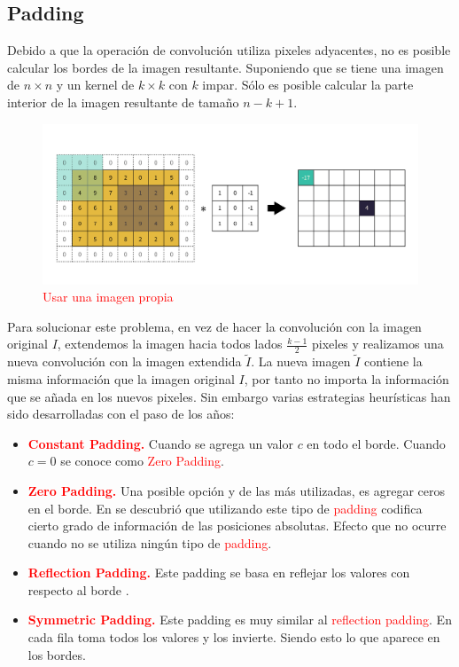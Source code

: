 \subsection{Padding}
 Debido a que la operación de convolución utiliza  pixeles adyacentes, no es posible calcular los bordes de la imagen resultante. Suponiendo que se tiene una imagen de $n\times n$ y un kernel de $k\times k$ con $k$ impar. Sólo es posible calcular la parte interior de la imagen resultante de tamaño $n-k+1$.
 \begin{figure}[H]
    \centering
     \includegraphics[width = 5in]{../cap2_CNNs/src/padding.png}
     \caption{\textcolor{red}{Usar una imagen propia}}
 \end{figure} 
 Para solucionar este problema, en vez de hacer la convolución con la imagen original $I$, extendemos la imagen hacia todos lados $\frac{k-1}{2}$ pixeles y realizamos una nueva convolución con la imagen extendida $\tilde I$.
 La nueva imagen $\tilde I$ contiene la misma información que la imagen original $I$, por tanto no importa la información que se añada en los nuevos pixeles. Sin embargo varias estrategias heurísticas han sido desarrolladas con el paso de los años:
\begin{itemize}
    \item \textcolor{red}{\textbf{Constant Padding.}} Cuando  se agrega un valor $c$ en todo el borde. Cuando $c = 0$ se conoce como \textcolor{red}{Zero Padding}.
    \item \textcolor{red}{\textbf{Zero Padding.}} Una posible opción y de las más utilizadas, es agregar ceros en el borde. En \cite{padding} se descubrió que utilizando este tipo de \textcolor{red}{padding} codifica cierto grado de información de las posiciones absolutas. Efecto que no ocurre cuando no se utiliza ningún tipo de \textcolor{red}{padding}. 
    \item \textcolor{red}{\textbf{Reflection Padding.}} Este padding se basa en reflejar los valores con respecto al borde \cite{type_of_paddings}.
    \item \textcolor{red}{\textbf{Symmetric Padding.}} Este padding es muy similar al \textcolor{red}{reflection padding}. En cada fila toma todos los valores y los invierte. Siendo esto lo que aparece en los bordes.
\end{itemize}
